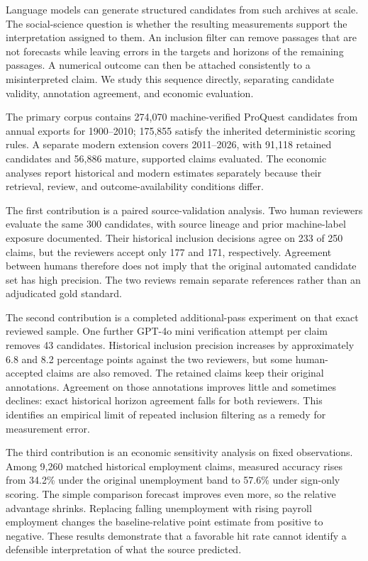 \documentclass[iicol,pdflatex,sn-mathphys-num]{sn-jnl}
\begin{document}
Language models can generate structured candidates from such archives at scale. The social-science question is whether the resulting measurements support the interpretation assigned to them. An inclusion filter can remove passages that are not forecasts while leaving errors in the targets and horizons of the remaining passages. A numerical outcome can then be attached consistently to a misinterpreted claim. We study this sequence directly, separating candidate validity, annotation agreement, and economic evaluation.

The primary corpus contains 274,070 machine-verified ProQuest candidates from annual exports for 1900--2010; 175,855 satisfy the inherited deterministic scoring rules. A separate modern extension covers 2011--2026, with 91,118 retained candidates and 56,886 mature, supported claims evaluated. The economic analyses report historical and modern estimates separately because their retrieval, review, and outcome-availability conditions differ.

The first contribution is a paired source-validation analysis. Two human reviewers evaluate the same 300 candidates, with source lineage and prior machine-label exposure documented. Their historical inclusion decisions agree on 233 of 250 claims, but the reviewers accept only 177 and 171, respectively. Agreement between humans therefore does not imply that the original automated candidate set has high precision. The two reviews remain separate references rather than an adjudicated gold standard.

The second contribution is a completed additional-pass experiment on that exact reviewed sample. One further GPT-4o mini verification attempt per claim removes 43 candidates. Historical inclusion precision increases by approximately 6.8 and 8.2 percentage points against the two reviewers, but some human-accepted claims are also removed. The retained claims keep their original annotations. Agreement on those annotations improves little and sometimes declines: exact historical horizon agreement falls for both reviewers. This identifies an empirical limit of repeated inclusion filtering as a remedy for measurement error.

The third contribution is an economic sensitivity analysis on fixed observations. Among 9,260 matched historical employment claims, measured accuracy rises from 34.2\% under the original unemployment band to 57.6\% under sign-only scoring. The simple comparison forecast improves even more, so the relative advantage shrinks. Replacing falling unemployment with rising payroll employment changes the baseline-relative point estimate from positive to negative. These results demonstrate that a favorable hit rate cannot identify a defensible interpretation of what the source predicted.
\end{document}
